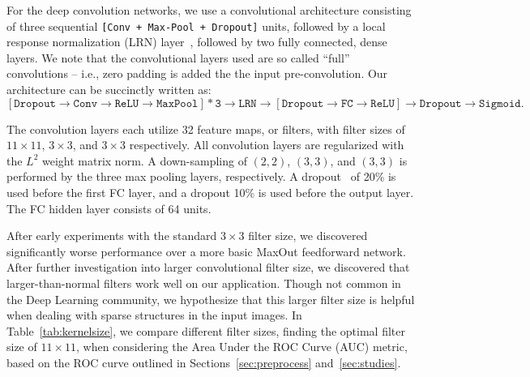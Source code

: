 For the deep convolution networks, we use a convolutional architecture consisting of three sequential \texttt{[Conv + Max-Pool + Dropout]} units, followed by a local response normalization (LRN) layer~\cite{dropout:and:LRN}, followed by two fully connected, dense layers. We note that the convolutional layers used are so called ``full'' convolutions -- i.e., zero padding is added the the input pre-convolution. Our architecture can be succinctly written as:
\begin{equation}
  \mathtt{[Dropout \rightarrow Conv \rightarrow ReLU \rightarrow MaxPool] * 3 \rightarrow LRN \rightarrow [Dropout \rightarrow FC \rightarrow ReLU]  \rightarrow Dropout \rightarrow Sigmoid}.
\end{equation}

The convolution layers each utilize 32 feature maps, or filters, with filter sizes of $11\times 11$, $3\times 3$, and $3\times 3$ respectively.  All convolution layers are regularized with the $L^{2}$ weight matrix norm.  A down-sampling of $(2, 2)$, $(3, 3)$, and $(3, 3)$ is performed by the three max pooling layers, respectively.  A dropout~\cite{dropout:and:LRN} of 20\% is used before the first FC layer, and a dropout 10\% is used before the output layer.  The FC hidden layer consists of 64 units.

After early experiments with the standard $3\times 3$ filter size, we discovered significantly worse performance over a more basic MaxOut \cite{maxout:goodfellow} feedforward network. After further investigation into larger convolutional filter size, we discovered that larger-than-normal filters work well on our application. Though not common in the Deep Learning community, we hypothesize that this larger filter size is helpful when dealing with sparse structures in the input images. In Table~\ref{tab:kernelsize}, we compare different filter sizes,  finding the optimal filter size of $11\times11$, when considering the Area Under the ROC Curve (AUC) metric, based on the ROC curve outlined in Sections~\ref{sec:preprocess} and~\ref{sec:studies}.

